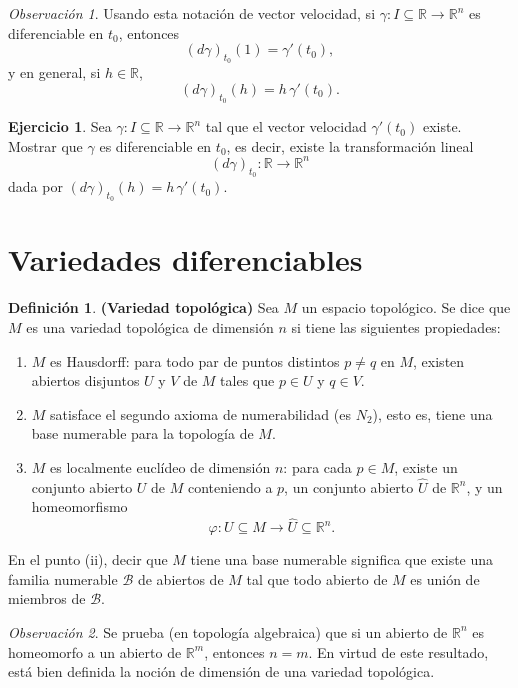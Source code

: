 \documentclass[11pt]{article}
\theoremstyle{definition}
\newtheorem*{definition}{Definici\'on}
\newtheorem*{exercise}{Ejercicio}
\theoremstyle{remark}
\newtheorem*{remark}{Observaci\'on}
\begin{document}
\begin{remark}
Usando esta notaci\'on de vector velocidad, si $\gamma:I\subseteq \mathbb{R}\to \mathbb{R}^n$ es diferenciable en $t_0$, entonces
\[
(d\gamma)_{t_0}(1)=\gamma'(t_0),
\]
y en general, si $h\in \mathbb{R}$,
\[
(d\gamma)_{t_0}(h)=h\,\gamma'(t_0).
\]
\end{remark}

\begin{exercise}
Sea $\gamma:I\subseteq \mathbb{R}\to \mathbb{R}^n$ tal que el vector velocidad $\gamma'(t_0)$ existe. Mostrar que $\gamma$ es diferenciable en $t_0$, es decir, existe la transformaci\'on lineal
\[
(d\gamma)_{t_0}:\mathbb{R}\to \mathbb{R}^n
\]
dada por $(d\gamma)_{t_0}(h)=h\,\gamma'(t_0)$.
\end{exercise}

\section*{Variedades diferenciables}

\begin{definition}
\textbf{(Variedad topol\'ogica)}\;
Sea $M$ un espacio topol\'ogico. Se dice que $M$ es una variedad topol\'ogica de dimensi\'on $n$ si tiene las siguientes propiedades:
\begin{enumerate}
\item $M$ es Hausdorff: para todo par de puntos distintos $p\neq q$ en $M$, existen abiertos disjuntos $U$ y $V$ de $M$ tales que $p\in U$ y $q\in V$.
\item $M$ satisface el segundo axioma de numerabilidad (es $N_2$), esto es, tiene una base numerable para la topolog\'ia de $M$.
\item $M$ es localmente eucl\'ideo de dimensi\'on $n$: para cada $p\in M$, existe un conjunto abierto $U$ de $M$ conteniendo a $p$, un conjunto abierto $\widehat U$ de $\mathbb{R}^n$, y un homeomorfismo
\[
\varphi:U\subseteq M\longrightarrow \widehat U\subseteq \mathbb{R}^n.
\]
\end{enumerate}
\end{definition}

\noindent En el punto (ii), decir que $M$ tiene una base numerable significa que existe una familia numerable $\mathcal{B}$ de abiertos de $M$ tal que todo abierto de $M$ es uni\'on de miembros de $\mathcal{B}$.

\begin{remark}
Se prueba (en topolog\'ia algebraica) que si un abierto de $\mathbb{R}^n$ es homeomorfo a un abierto de $\mathbb{R}^m$, entonces $n=m$. En virtud de este resultado, est\'a bien definida la noci\'on de dimensi\'on de una variedad topol\'ogica.
\end{remark}
\end{document}
